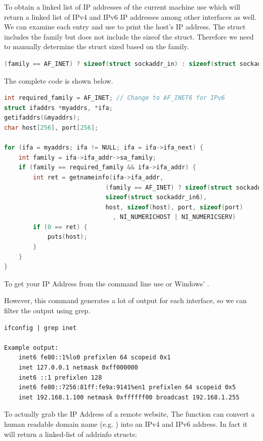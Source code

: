 To obtain a linked list of IP addresses of the current machine use  which will return a linked list of IPv4 and IPv6 IP addresses among other interfaces as well.
We can examine each entry and use  to print the host's IP address.
The  struct includes the family but does not include the sizeof the struct.
Therefore we need to manually determine the struct sized based on the family.

\begin{lstlisting}[language=C]
(family == AF_INET) ? sizeof(struct sockaddr_in) : sizeof(struct sockaddr_in6)
\end{lstlisting}

The complete code is shown below.

\begin{lstlisting}[language=C]
int required_family = AF_INET; // Change to AF_INET6 for IPv6
struct ifaddrs *myaddrs, *ifa;
getifaddrs(&myaddrs);
char host[256], port[256];

for (ifa = myaddrs; ifa != NULL; ifa = ifa->ifa_next) {
    int family = ifa->ifa_addr->sa_family;
    if (family == required_family && ifa->ifa_addr) {
        int ret = getnameinfo(ifa->ifa_addr,
                            (family == AF_INET) ? sizeof(struct sockaddr_in) :
                            sizeof(struct sockaddr_in6),
                            host, sizeof(host), port, sizeof(port)
                              , NI_NUMERICHOST | NI_NUMERICSERV)
        if (0 == ret) {
            puts(host);
        }
    }
}
\end{lstlisting}

To get your IP Address from the command line use  or Windows' .

However, this command generates a lot of output for each interface, so we can filter the output using grep.

\begin{lstlisting}
ifconfig | grep inet

Example output:
    inet6 fe80::1%lo0 prefixlen 64 scopeid 0x1
    inet 127.0.0.1 netmask 0xff000000
    inet6 ::1 prefixlen 128
    inet6 fe80::7256:81ff:fe9a:9141%en1 prefixlen 64 scopeid 0x5
    inet 192.168.1.100 netmask 0xffffff00 broadcast 192.168.1.255
\end{lstlisting}

To actually grab the IP Address of a remote website, The function  can convert a human readable domain name (e.g. ) into an IPv4 and IPv6 address.
In fact it will return a linked-list of addrinfo structs:

